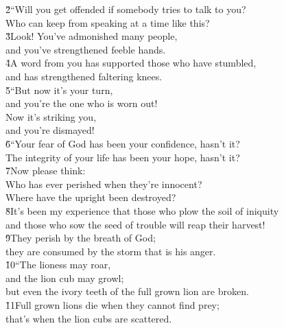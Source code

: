 \begin{poetry}
\poeml \v{2}``Will you get offended if somebody tries to talk to you? \\
\poemll    Who can keep from speaking at a time like this? \\
\poeml \v{3}Look! You've admonished many people, \\
\poemll    and you've strengthened feeble hands. \\
\poeml \v{4}A word from you has supported those who have stumbled, \\
\poemll    and has strengthened faltering knees. \\
\poeml \v{5}``But now it's your turn, \\
\poemll    and you're the one who is worn out! \\
\poeml Now it's striking you, \\
\poemll    and you're dismayed! \\
\poeml \v{6}``Your fear of God has been your confidence, hasn't it? \\
\poemll    The integrity of your life has been your hope, hasn't it? \\
\poeml \v{7}Now please think: \\
\poemll    Who has ever perished when they're innocent? \\
\poemlll       Where have the upright been destroyed? \\
\poeml \v{8}It's been my experience that those who plow the soil of iniquity \\
\poemll    and those who sow the seed of trouble will reap their harvest! \\
\poeml \v{9}They perish by the breath of God; \\
\poemll    they are consumed by the storm that is his anger. \\
\poeml \v{10}``The lioness may roar, \\
\poemll    and the lion cub may growl; \\
\poemlll       but even the ivory teeth of the full grown lion are broken. \\
\poeml \v{11}Full grown lions die when they cannot find prey; \\
\poemll    that's when the lion cubs are scattered. \\

\end{poetry}
